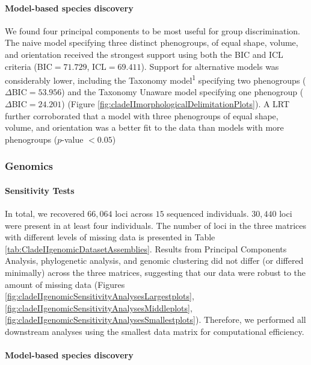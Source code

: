 \documentclass[
  11pt,
]{article}
\begin{document}
\hypertarget{model-based-species-discovery-2}{%
\paragraph{Model-based species discovery}\label{model-based-species-discovery-2}}

We found four principal components to be most useful for group discrimination. The naive model specifying three distinct phenogroups, of equal shape, volume, and orientation received the strongest support using both the BIC and ICL criteria (BIC\(=71.729\), ICL\(=69.411\)). Support for alternative models was considerably lower, including the Taxonomy model\textsuperscript{1} specifying two phenogroups (\(\Delta\)BIC\(=53.956\)) and the Taxonomy Unaware model specifying one phenogroup (\(\Delta\)BIC\(=24.201\)) (Figure \ref{fig:cladeIImorphologicalDelimitationPlots}). A LRT further corroborated that a model with three phenogroups of equal shape, volume, and orientation was a better fit to the data than models with more phenogroups (\(p\)-value \(<0.05\))

\hypertarget{genomics-2}{%
\subsubsection{Genomics}\label{genomics-2}}

\hypertarget{sensitivity-tests-1}{%
\paragraph{Sensitivity Tests}\label{sensitivity-tests-1}}

In total, we recovered \(66,064\) loci across \(15\) sequenced individuals. \(30,440\) loci were present in at least four individuals. The number of loci in the three matrices with different levels of missing data is presented in Table \ref{tab:CladeIIgenomicDatasetAssemblies}. Results from Principal Components Analysis, phylogenetic analysis, and genomic clustering did not differ (or differed minimally) across the three matrices, suggesting that our data were robust to the amount of missing data (Figures \ref{fig:cladeIIgenomicSensitivityAnalysesLargestplots}, \ref{fig:cladeIIgenomicSensitivityAnalysesMiddleplots}, \ref{fig:cladeIIgenomicSensitivityAnalysesSmallestplots}). Therefore, we performed all downstream analyses using the smallest data matrix for computational efficiency.

\hypertarget{model-based-species-discovery-3}{%
\paragraph{Model-based species discovery}\label{model-based-species-discovery-3}}
\end{document}
